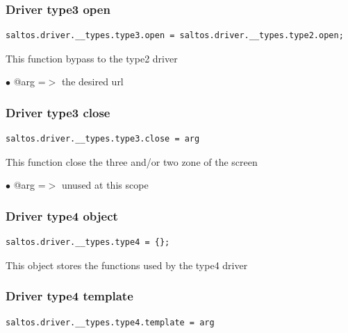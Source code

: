 \documentclass[a4paper]{article}
\begin{document}
\hypertarget{toc194}{}
\subsubsection{Driver type3 open}

\begin{lstlisting}
saltos.driver.__types.type3.open = saltos.driver.__types.type2.open;
\end{lstlisting}

This function bypass to the type2 driver

\begin{compactitem}
\item[\color{myblue}$\bullet$] @arg =$>$ the desired url
\end{compactitem}

\hypertarget{toc195}{}
\subsubsection{Driver type3 close}

\begin{lstlisting}
saltos.driver.__types.type3.close = arg
\end{lstlisting}

This function close the three and/or two zone of the screen

\begin{compactitem}
\item[\color{myblue}$\bullet$] @arg =$>$ unused at this scope
\end{compactitem}

\hypertarget{toc196}{}
\subsubsection{Driver type4 object}

\begin{lstlisting}
saltos.driver.__types.type4 = {};
\end{lstlisting}

This object stores the functions used by the type4 driver

\hypertarget{toc197}{}
\subsubsection{Driver type4 template}

\begin{lstlisting}
saltos.driver.__types.type4.template = arg
\end{lstlisting}
\end{document}
